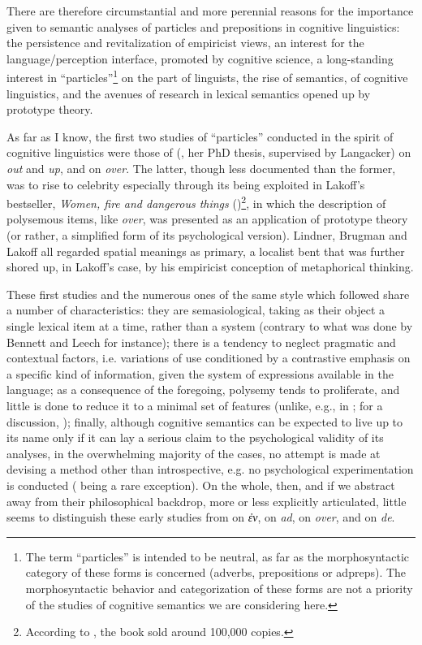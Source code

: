 \documentclass[output=paper]{langscibook}
\begin{document}
There are therefore circumstantial and more perennial reasons for the importance given to semantic analyses of particles and prepositions in cognitive linguistics: the persistence and revitalization of empiricist views, an interest for the language\slash perception interface, promoted by cognitive science, a long-standing interest in “particles”\footnote{\textrm{ The term “particles” is intended to be neutral, as far as the morphosyntactic category of these forms is concerned (adverbs, prepositions or adpreps). The morphosyntactic behavior and categorization of these forms are not a priority of the studies of cognitive semantics we are considering here. }} on the part of linguists, the rise of semantics, of cognitive linguistics, and the avenues of research in lexical semantics opened up by prototype theory.

As far as I know, the first two studies of “particles” conducted in the spirit of cognitive linguistics were those of \citeauthor{lindner_lexico-semantic_1981} (\citeyear{lindner_lexico-semantic_1981}, her PhD thesis, supervised by Langacker) on \textit{out} and \textit{up}, and \citet{brugman_story_1981} on \textit{over}. The latter, though less documented than the former, was to rise to celebrity especially through its being exploited in Lakoff’s bestseller, \textit{Women, fire and dangerous things} (\citeyear{Lakoff1987})\footnote{According to \citet{dirven_does_2001}, the book sold around 100,000 copies.}, in which the description of polysemous items, like \textit{over}, was presented as an application of prototype theory (or rather, a simplified form of its psychological version). Lindner, Brugman and Lakoff all regarded spatial meanings as primary, a localist bent that was further shored up, in Lakoff’s case, by his empiricist conception of metaphorical thinking.

These first studies and the numerous ones of the same style which followed share a number of characteristics: they are semasiological, taking as their object a single lexical item at a time, rather than a system (contrary to what was done by Bennett and Leech for instance); there is a tendency to neglect pragmatic and contextual factors, i.e. variations of use conditioned by a contrastive emphasis on a specific kind of information, given the system of expressions available in the language; as a consequence of the foregoing, polysemy tends to proliferate, and little is done to reduce it to a minimal set of features (unlike, e.g., in \citealt{pottier_systematique_1962}; for a discussion, \citealt{fortis_probleme_2009}); finally, although cognitive semantics can be expected to live up to its name only if it can lay a serious claim to the psychological validity of its analyses, in the overwhelming majority of the cases, no attempt is made at devising a method other than introspective, e.g. no psychological experimentation is conducted (\citealt{sandra_network_1995} being a rare exception). On the whole, then, and if we abstract away from their philosophical backdrop, more or less explicitly articulated, little seems to distinguish these early studies from \citet{aristotle_physics_1957} on \textit{ἐν}, \citet{leibniz_analysis_1986} on \textit{ad}, \citet{harris_hermes_1773} on \textit{over}, and \citet{condillac_cours_1775} on \textit{de}.
\end{document}
